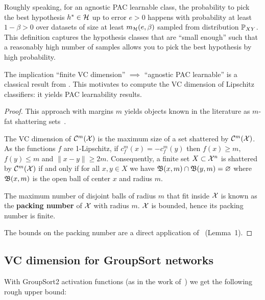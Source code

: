     Roughly speaking, for an agnostic PAC learnable class, the probability to pick the best hypothesis $h^{*}\in\mathcal{H}$ up to error $e>0$ happens with probability at least $1-\beta>0$ over datasets of size at least $m_{\mathcal{H}}(e,\beta)$ sampled from distribution $\mathbb{P}_{XY}$. This definition captures the hypothesis classes that are ``small enough'' such that a reasonably high number of samples allows you to pick the best hypothesis by high probability.  
    
    The implication ``finite VC dimension'' $\implies$ ``agnostic PAC learnable'' is a classical result from \cite{blumer1989learnability}. This motivates to compute the VC dimension of Lipschitz classifiers: it yields PAC learnability results.   
    
    \lipschitzpaclearnable*
          
            \begin{proof}
                  
                This approach with margins $m$ yields objects known in the literature as $m$-fat shattering sets~\cite{gottlieb2014efficient}.  
                  
                The VC dimension of $\mathcal{C}^m(\mathcal{X})$ is the maximum size of a set shattered by $\mathcal{C}^m(\mathcal{X})$. As the functions $f$ are \mbox{1-Lipschitz}, if $c^m_f(x)=-c^m_f(y)$ then $f(x)\geq m$, $f(y)\leq m$ and $\|x-y\|\geq 2m$. Consequently, a finite set $X\subset\mathcal{X}^n$ is shattered by $\mathcal{C}^m(\mathcal{X})$ if and only if for all $x,y\in X$ we have $\mathfrak{B}(x,m)\cap\mathfrak{B}(y,m)=\varnothing$ where $\mathfrak{B}(x,m)$ is the open ball of center $x$ and radius $m$.  
                  
                The maximum number of disjoint balls of radius $m$ that fit inside $\mathcal{X}$ is known as the \textbf{packing number} of $\mathcal{X}$ with radius $m$. $\mathcal{X}$ is bounded, hence its packing number is finite.  
                  
                The bounds on the packing number are a direct application of \cite{szarek1997metric}~(Lemma~1).
            \end{proof}  
      
    \subsection{VC dimension for GroupSort networks}\label{app:groupsortvcbound}
        
            With GroupSort2 activation functions (as in the work of~\cite{tanielian2021approximating}) we get the following rough upper bound:
              
